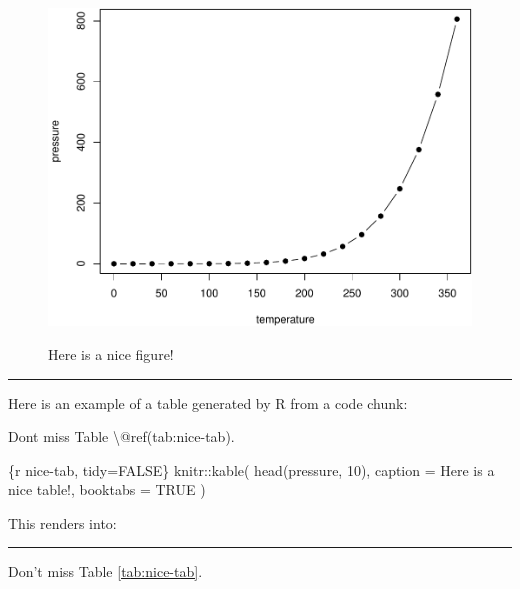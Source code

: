 \documentclass[
]{book}
\newenvironment{Shaded}{\begin{snugshade}}{\end{snugshade}}
\newcommand{\NormalTok}[1]{#1}
\theoremstyle{definition}
\theoremstyle{definition}
\theoremstyle{definition}
\theoremstyle{definition}
\theoremstyle{remark}
\begin{document}
\begin{figure}

{\centering \includegraphics[width=0.8\linewidth,alt={Plot with connected points showing that vapor pressure of mercury increases exponentially as temperature increases.}]{_main_files/figure-latex/nice-fig-1} 

}

\caption{Here is a nice figure!}\label{fig:nice-fig}
\end{figure}

\begin{center}\rule{0.5\linewidth}{0.5pt}\end{center}

Here is an example of a table generated by R from a code chunk:

\begin{Shaded}
\begin{Highlighting}[]
\NormalTok{Don\textquotesingle{}t miss Table \textbackslash{}@ref(tab:nice{-}tab).}

\NormalTok{\textasciigrave{}\textasciigrave{}\textasciigrave{}\{r nice{-}tab, tidy=FALSE\}}
\NormalTok{knitr::kable(}
\NormalTok{  head(pressure, 10), caption = \textquotesingle{}Here is a nice table!\textquotesingle{},}
\NormalTok{  booktabs = TRUE}
\NormalTok{)}
\NormalTok{\textasciigrave{}\textasciigrave{}\textasciigrave{}}
\end{Highlighting}
\end{Shaded}

This renders into:

\begin{center}\rule{0.5\linewidth}{0.5pt}\end{center}

Don't miss Table \ref{tab:nice-tab}.
\end{document}
